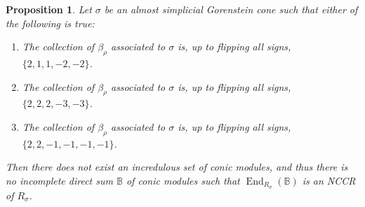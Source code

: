 \documentclass[reqno, 12pt]{amsart}
\newtheorem{proposition}[theorem]{Proposition}
\theoremstyle{definition}
\numberwithin{equation}{section}
\newcommand{\End}{\operatorname{End}}
\begin{document}
\begin{proposition}
    \label{Prop:SpecialCasesWithoutNCCR}
    Let $\sigma$ be an almost simplicial Gorenstein cone such that either of the following is true:
    \begin{enumerate}
        \item The collection of $\beta_\rho$ associated to $\sigma$ is, up to flipping all signs, $\{2,1,1,-2,-2\}$.
        \item The collection of $\beta_\rho$ associated to $\sigma$ is, up to flipping all signs, $\{2,2,2,-3,-3\}$.
        \item The collection of $\beta_\rho$ associated to $\sigma$ is, up to flipping all signs, $\{2,2,-1,-1,-1,-1\}$.
    \end{enumerate}
    Then there does not exist an incredulous set of conic modules, and thus there is no incomplete direct sum $\mathbb{B}$ of conic modules such that $\End_{R_\sigma}(\mathbb{B})$ is an NCCR of $R_\sigma$.
\end{proposition}
\end{document}
